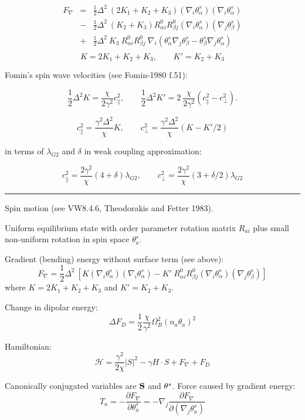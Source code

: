 \documentclass[a4paper]{article}
\begin{document}
\begin{eqnarray*}
F_\nabla
&=& \frac12 \Delta^2\ (2 K_1 + K_2 + K_3)
(\nabla_i\theta^s_\alpha) (\nabla_i\theta^s_\alpha)\\
&-& \frac12 \Delta^2\ (K_2+K_3)
R^0_{\alpha i}R^0_{\beta j}(\nabla_i\theta^s_\alpha)(\nabla_j\theta^s_\beta)\\
&+& \frac12 \Delta^2\ K_3
\ R^0_{\alpha i}R^0_{\beta j}
\ \nabla_i(\theta^s_\alpha \nabla_j\theta^s_\beta - \theta^s_\beta \nabla_j\theta^s_\alpha)\\
\end{eqnarray*}
$$
K=2K_1+K_2+K_3,\qquad K'=K_2+K_3
$$

Fomin's spin wave velocities (see Fomin-1980 f.51):

$$
\frac12\Delta^2 K  = \frac{\chi}{2\gamma^2} c_\parallel^2,\qquad
\frac12\Delta^2 K' = 2\ \frac{\chi}{2\gamma^2} (c_\parallel^2 - c_\perp^2).
$$

$$
c_\parallel^2 = \frac{\gamma^2 \Delta^2}{\chi} K,\qquad
c_\perp^2 = \frac{\gamma^2 \Delta^2}{\chi} (K-K'/2)
$$

in terms of $\lambda_{G2}$ and $\delta$ in weak coupling approximation:

$$
c_\parallel^2 = \frac{2\gamma^2}{\chi} (4+\delta)\lambda_{G2},\qquad
c_\perp^2     = \frac{2\gamma^2}{\chi} (3+\delta/2)\lambda_{G2}
$$



\eject
\hrule
\medskip

Spin motion (see VW8.4.6, Theodorakis and Fetter 1983).

Uniform equilibrium state with order parameter rotation matrix $R_{ai}$ plus
small non-uniform rotation in spin space $\theta^s_a$.

Gradient (bending) energy without surface term (see above):
$$
F_\nabla = \frac12 \Delta^2\ [
K (\nabla_i\theta^s_\alpha) (\nabla_i\theta^s_\alpha)
- K'\ R^0_{\alpha i}R^0_{\beta j}(\nabla_i\theta^s_\alpha)(\nabla_j\theta^s_\beta)]
$$
where $K=2K_1+K_2+K_3$ and $K'=K_2+K_3$.

Change in dipolar energy:
$$
\Delta F_D = \frac12 \frac{\chi}{\gamma^2}\Omega_B^2 (n_a \theta_a)^2
$$

Hamiltonian:
$$
\mathcal{H} = \frac{\gamma^2}{2\chi} |S|^2 - \gamma H \cdot S + F_\nabla +  F_D
$$

Canonically conjugated variables are $\bf S$ and ${\bf \theta}^s$. Force
caused by gradient energy:
$$
T_a = -\frac{\partial F_\nabla}{\partial\theta_a^s}
= -\nabla_j \frac{\partial F_\nabla}{\partial(\nabla_j\theta_a^s)}
$$
\end{document}
